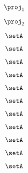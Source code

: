 \begin{forslides}
     \begin{equation}
        \label{eq:combination-154}
        \proj_1
    \end{equation}
    
     \begin{equation}
        \label{eq:combination-155}
        \proj_2
    \end{equation}
    
    \begin{equation}
        \label{eq:combination-156}
        \setA
    \end{equation}
    
     \begin{equation}
        \label{eq:combination-157}
        \setA
    \end{equation}
    
     \begin{equation}
        \label{eq:combination-158}
        \setA
    \end{equation}
    
    \begin{equation}
        \label{eq:combination-159}
       \setA
    \end{equation}
    
       \begin{equation}
        \label{eq:combination-160}
        \setA
    \end{equation}
       
     \begin{equation}
        \label{eq:combination-161}
        \setA
    \end{equation}
    
     \begin{equation}
        \label{eq:combination-162}
        \setA
    \end{equation}
    
    \begin{equation}
        \label{eq:combination-163}
        \setA
    \end{equation}
    
     \begin{equation}
        \label{eq:combination-164}
        \setA
    \end{equation}
    
     \begin{equation}
        \label{eq:combination-165}
        \setA
    \end{equation}
    
    \begin{equation}
        \label{eq:combination-166}
        \setA
    \end{equation}
    

\end{forslides}
